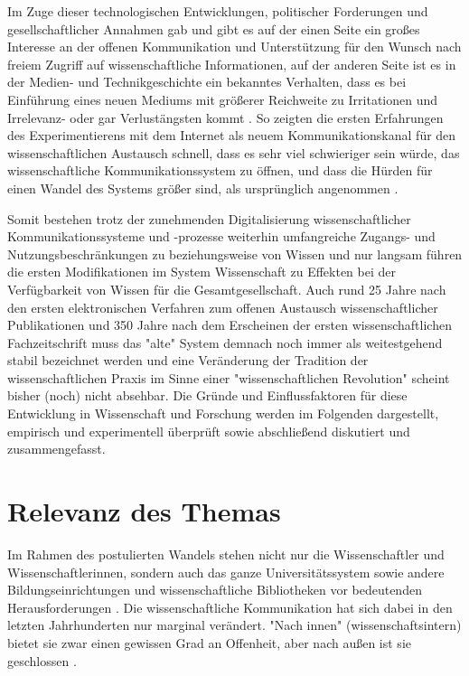 Im Zuge dieser technologischen Entwicklungen, politischer Forderungen und gesellschaftlicher Annahmen gab und gibt es auf der einen Seite ein großes Interesse an der offenen Kommunikation und Unterstützung für den Wunsch nach freiem Zugriff auf wissenschaftliche Informationen, auf der anderen Seite ist es in der Medien- und Technikgeschichte ein bekanntes Verhalten, dass es bei Einführung eines neuen Mediums mit größerer Reichweite zu Irritationen \cite{naeder_2010_open} und Irrelevanz- oder gar Verlustängsten kommt \cite{hagner_2015_sache_buches}. So zeigten die ersten Erfahrungen des Experimentierens mit dem Internet als neuem Kommunikationskanal für den wissenschaftlichen Austausch schnell, dass es sehr viel schwieriger sein würde, das wissenschaftliche Kommunikationssystem zu öffnen, und dass die Hürden für einen Wandel des Systems größer sind, als ursprünglich angenommen \cite{bjork_2004_open}.

Somit bestehen trotz der zunehmenden Digitalisierung wissenschaftlicher Kommunikationssysteme und -prozesse weiterhin umfangreiche Zugangs- und Nutzungsbeschränkungen zu beziehungsweise von Wissen und nur langsam führen die ersten Modifikationen im System Wissenschaft zu Effekten bei der Verfügbarkeit von Wissen für die Gesamtgesellschaft. Auch rund 25 Jahre nach den ersten elektronischen Verfahren zum offenen Austausch wissenschaftlicher Publikationen und 350 Jahre nach dem Erscheinen der ersten wissenschaftlichen Fachzeitschrift muss das "alte" System demnach noch immer als weitestgehend stabil bezeichnet werden \cite{brembs2015open} \cite{Hanekop_2014} \cite{Warnke_2012} und eine Veränderung der Tradition der wissenschaftlichen Praxis im Sinne einer "wissenschaftlichen Revolution" \cite{kuhn2012structure} scheint bisher (noch) nicht absehbar. Die Gründe und Einflussfaktoren für diese Entwicklung in Wissenschaft und Forschung werden im Folgenden dargestellt, empirisch und experimentell überprüft sowie abschließend diskutiert und zusammengefasst.

\section{Relevanz des Themas}

Im Rahmen des postulierten Wandels stehen nicht nur die Wissenschaftler und Wissenschaftlerinnen, sondern auch das ganze Universitätssystem sowie andere Bildungseinrichtungen und wissenschaftliche Bibliotheken vor bedeutenden Herausforderungen \cite{muller_2010_open} \cite{Harter2006} \cite{Gu_don_2004} \cite{osterloh2008anreize} \cite{Beverungen_2014}. Die wissenschaftliche Kommunikation hat sich dabei in den letzten Jahrhunderten nur marginal verändert. "Nach innen" (wissenschaftsintern) bietet sie zwar einen gewissen Grad an Offenheit, aber nach außen ist sie geschlossen \cite{kelty_2004}.

